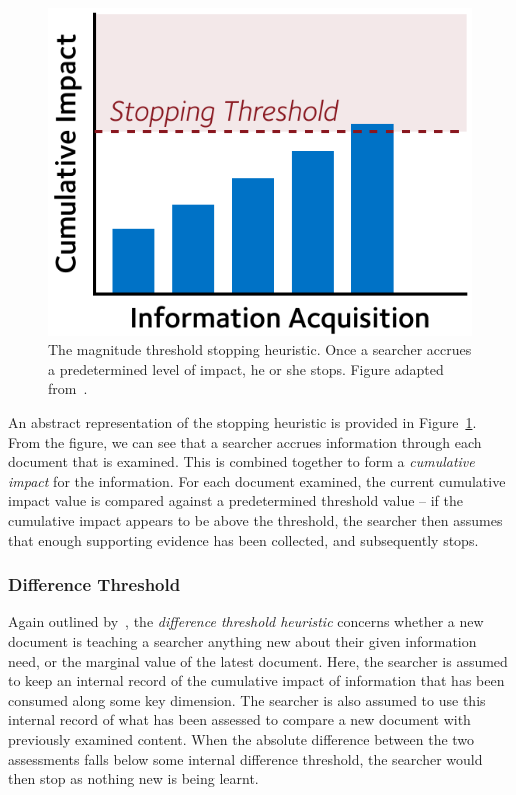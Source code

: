 \begin{figure}
    \begin{center}
    \vspace*{-10mm}
    \includegraphics[width=1\textwidth]{figures/ch3-threshold.pdf}
    \end{center}
    \vspace*{-4mm}
    \caption[The magnitude threshold stopping heuristic]{The magnitude threshold stopping heuristic. Once a searcher accrues a predetermined level of impact, he or she stops. Figure adapted from~\cite{browne2004stopping_rules}.}
    \label{fig:threshold}
\end{figure}

An abstract representation of the stopping heuristic is provided in Figure~\ref{fig:threshold}. From the figure, we can see that a searcher accrues information through each document that is examined. This is combined together to form a \emph{cumulative impact} for the information. For each document examined, the current cumulative impact value is compared against a predetermined threshold value -- if the cumulative impact appears to be above the threshold, the searcher then assumes that enough supporting evidence has been collected, and subsequently stops.

\subsubsection{Difference Threshold}\label{sec:stopping_background:heuristics:judgement:difference}
Again outlined by~\citep{nickles1995judgment}, the \emph{difference threshold heuristic} concerns whether a new document is teaching a searcher anything new about their given information need, or the marginal value of the latest document. Here, the searcher is assumed to keep an internal record of the cumulative impact of information that has been consumed along some key dimension. The searcher is also assumed to use this internal record of what has been assessed to compare a new document with previously examined content. When the absolute difference between the two assessments falls below some internal difference threshold, the searcher would then stop as nothing new is being learnt.

